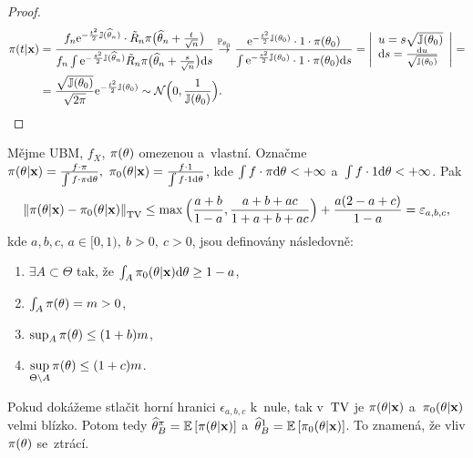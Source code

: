 \begin{dusl}
\begin{proof}
\[\begin{split}
		\pi(t|\textbf{x})&=\frac{f_n\mathrm{e}^{-\frac{t^2}{2}\mathbb{J}(\widehat{\theta}_n)}\cdot\tilde{R}_n \pi\big( \widehat{\theta}_n+\frac{t}{\sqrt{n}} \big)}{f_n\int \mathrm{e}^{-\frac{s^2}{2}\mathbb{J}(\widehat{\theta}_n)}\tilde{R}_n \pi\big(\widehat{\theta}_n+\frac{s}{\sqrt{n}}\big)\mathrm{d} s}\stackrel{\mathbb{P}_{\theta_0}}{\to}\frac{\mathrm{e}^{-\frac{t^2}{2}\mathbb{J}(\theta_0)}\cdot1\cdot \pi(\theta_0)}{\int\mathrm{e}^{-\frac{s^2}{2}\mathbb{J}(\theta_0)}\cdot1\cdot\pi(\theta_0)\mathrm{d} s}=\left| \begin{array}{l}
		u=s\sqrt{\mathbb{J}(\theta_0)}\\\mathrm{d} s=\frac{\mathrm{d} u}{\sqrt{\mathbb{J}(\theta_0)}}		
		\end{array}
		\right|=\\&=\frac{\sqrt{\mathbb{J}(\theta_0)}}{\sqrt{2\pi}}\mathrm{e}^{-\frac{t^2}{2}\mathbb{J}(\theta_0)}\sim\mathcal{N}\Big( 0,\frac{1}{\mathbb{J}(\theta_0)} \Big).
		\end{split}
		\]
	\end{proof}
\end{dusl}
\begin{theorem}
	Mějme UBM, $f_X$, $\pi(\theta)$ omezenou a~vlastní. Označme $\pi(\theta|\textbf{x})=\frac{f\cdot\pi}{\int f\cdot\pi\mathrm{d}\theta},~\pi_0(\theta|\textbf{x})=\frac{f\cdot1}{\int f\cdot1 \mathrm{d}\theta}$, kde $\int f\cdot\pi\mathrm{d}\theta<+\infty$ a~$\int f\cdot1 \mathrm{d}\theta<+\infty$. Pak
	$$ \left\|\pi(\theta|\textbf{x})-\pi_0(\theta|\textbf{x})\right\|_{\mathrm{TV}}\leq \max\Big(\frac{a+b}{1-a},\frac{a+b+ac}{1+a+b+ac}\Big)+\frac{a(2-a+c)}{1-a}=\varepsilon_{a,b,c},$$
	kde $a,b,c$, $a\in[0,1),~b>0,~c>0$, jsou definovány následovně:\begin{enumerate}[1)]
		\item $\exists A\subset \Theta$ tak, že $\int_A \pi_0(\theta|\textbf{x})\mathrm{d}\theta\geq 1-a$,
		\item $\int_A \pi(\theta)=m>0$,
		\item $\sup_A \pi(\theta)\leq (1+b)m$,
		\item $\sup\limits_{\Theta\setminus A} \pi(\theta)\leq(1+c)m$. 
	\end{enumerate}
\end{theorem}
\begin{dusl}
	Pokud dokážeme stlačit horní hranici $\epsilon_{a,b,c}$ k~nule, tak v~$\mathrm{TV}$ je $\pi(\theta|\textbf{x})$ a~$\pi_0(\theta|\textbf{x})$ velmi blízko. Potom tedy $\widehat{\theta}_B^\pi=\mathbb{E}\left[ \pi(\theta|\textbf{x}) \right]$ a~$\widehat{\theta}_B^1=\mathbb{E}\left[ \pi_0(\theta|\textbf{x}) \right]$. To znamená, že vliv $\pi(\theta)$ se~ztrácí.
\end{dusl}\newpage
